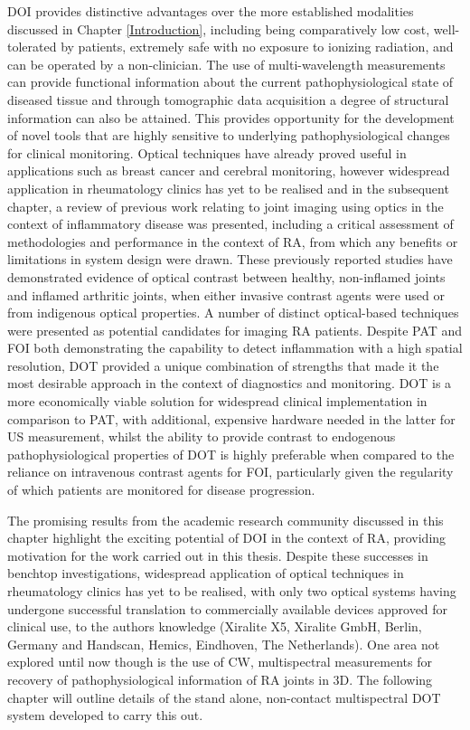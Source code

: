\documentclass[twoside]{bhamthesis}
\theoremstyle{definition}
\begin{document}
DOI provides distinctive advantages over the more established modalities discussed in Chapter \ref{Introduction}, including being comparatively low cost, well-tolerated by patients, extremely safe with no exposure to ionizing radiation, and can be operated by a non-clinician. The use of multi-wavelength measurements can provide functional information about the current pathophysiological state of diseased tissue and through tomographic data acquisition a degree of structural information can also be attained. This provides opportunity for the development of novel tools that are highly sensitive to underlying pathophysiological changes for clinical monitoring. Optical techniques have already proved useful in applications such as breast cancer and cerebral monitoring, however widespread application in rheumatology clinics has yet to be realised and in the subsequent chapter, a review of previous work relating to joint imaging using optics in the context of inflammatory disease was presented, including a critical assessment of methodologies and performance in the context of RA, from which any benefits or limitations in system design were drawn. These previously reported studies have demonstrated evidence of optical contrast between healthy, non-inflamed joints and inflamed arthritic joints, when either invasive contrast agents were used or from indigenous optical properties. A number of distinct optical-based techniques were presented as potential candidates for imaging RA patients. Despite PAT and FOI both demonstrating the capability to detect inflammation with a high spatial resolution, DOT provided a unique combination of strengths that made it the most desirable approach in the context of diagnostics and monitoring. DOT is a more economically viable solution for widespread clinical implementation in comparison to PAT, with additional, expensive hardware needed in the latter for US measurement, whilst the ability to provide contrast to endogenous pathophysiological properties of DOT is highly preferable when compared to the reliance on intravenous contrast agents for FOI, particularly given the regularity of which patients are monitored for disease progression.

The promising results from the academic research community discussed in this chapter highlight the exciting potential of DOI in the context of RA, providing motivation for the work carried out in this thesis. Despite these successes in benchtop investigations, widespread application of optical techniques in rheumatology clinics has yet to be realised, with only two optical systems having undergone successful translation to commercially available devices approved for clinical use, to the authors knowledge (Xiralite X5, Xiralite GmbH, Berlin, Germany and Handscan, Hemics, Eindhoven, The Netherlands). One area not explored until now though is the use of CW, multispectral measurements for recovery of pathophysiological information of RA joints in 3D. The following chapter will outline details of the stand alone, non-contact multispectral DOT system developed to carry this out.
\end{document}
